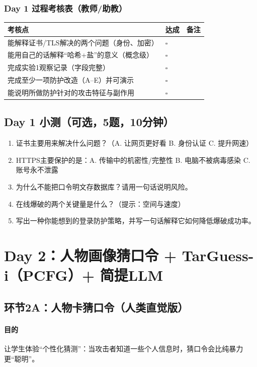 \documentclass[UTF8,a4paper,12pt]{ctexart}
\begin{document}
\subsubsection*{Day 1 过程考核表（教师/助教）}
\begin{longtable}{@{}p{}p{}p{}@{}}
\toprule
\textbf{考核点} & \textbf{达成} & \textbf{备注} \\
\midrule
\endhead
能解释证书/TLS解决的两个问题（身份、加密） & $\square$ & \\
能用自己的话解释``哈希+盐''的意义（概念级） & $\square$ & \\
完成实验1观察记录（字段完整） & $\square$ & \\
完成至少一项防护改造（A--E）并可演示 & $\square$ & \\
能说明所做防护针对的攻击特征与副作用 & $\square$ & \\
\bottomrule
\end{longtable}

\subsection*{Day 1 小测（可选，5题，10分钟）}
\begin{enumerate}
  \item 证书主要用来解决什么问题？（A. 让网页更好看 B. 身份认证 C. 提升网速）
  \item HTTPS主要保护的是：A. 传输中的机密性/完整性 B. 电脑不被病毒感染 C. 账号永不泄露
  \item 为什么不能把口令明文存数据库？请用一句话说明风险。
  \item 在线爆破的两个关键量是什么？（提示：空间与速度）
  \item 写出一种你能想到的登录防护策略，并写一句话解释它如何降低爆破成功率。
\end{enumerate}

\section{Day 2：人物画像猜口令 + TarGuess-i（PCFG）+ 简提LLM}

\subsection{环节2A：人物卡猜口令（人类直觉版）}
\paragraph{目的}
让学生体验``个性化猜测''：当攻击者知道一些个人信息时，猜口令会比纯暴力更``聪明''。
\end{document}

